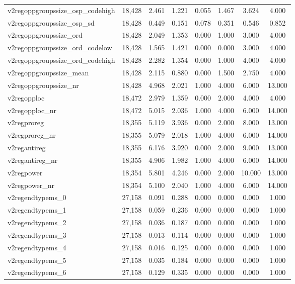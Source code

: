 \begin{table}[!htbp]
\begin{tabular}{@{\extracolsep{5pt}}lccccccc}
v2regoppgroupssize\_osp\_codehigh & 18,428 & 2.461 & 1.221 & 0.055 & 1.467 & 3.624 & 4.000 \\ 
v2regoppgroupssize\_osp\_sd & 18,428 & 0.449 & 0.151 & 0.078 & 0.351 & 0.546 & 0.852 \\ 
v2regoppgroupssize\_ord & 18,428 & 2.049 & 1.353 & 0.000 & 1.000 & 3.000 & 4.000 \\ 
v2regoppgroupssize\_ord\_codelow & 18,428 & 1.565 & 1.421 & 0.000 & 0.000 & 3.000 & 4.000 \\ 
v2regoppgroupssize\_ord\_codehigh & 18,428 & 2.282 & 1.354 & 0.000 & 1.000 & 4.000 & 4.000 \\ 
v2regoppgroupssize\_mean & 18,428 & 2.115 & 0.880 & 0.000 & 1.500 & 2.750 & 4.000 \\ 
v2regoppgroupssize\_nr & 18,428 & 4.968 & 2.021 & 1.000 & 4.000 & 6.000 & 13.000 \\ 
v2regopploc & 18,472 & 2.979 & 1.359 & 0.000 & 2.000 & 4.000 & 4.000 \\ 
v2regopploc\_nr & 18,472 & 5.015 & 2.036 & 1.000 & 4.000 & 6.000 & 14.000 \\ 
v2regproreg & 18,355 & 5.119 & 3.936 & 0.000 & 2.000 & 8.000 & 13.000 \\ 
v2regproreg\_nr & 18,355 & 5.079 & 2.018 & 1.000 & 4.000 & 6.000 & 14.000 \\ 
v2regantireg & 18,355 & 6.176 & 3.920 & 0.000 & 2.000 & 9.000 & 13.000 \\ 
v2regantireg\_nr & 18,355 & 4.906 & 1.982 & 1.000 & 4.000 & 6.000 & 14.000 \\ 
v2regpower & 18,354 & 5.801 & 4.246 & 0.000 & 2.000 & 10.000 & 13.000 \\ 
v2regpower\_nr & 18,354 & 5.100 & 2.040 & 1.000 & 4.000 & 6.000 & 14.000 \\ 
v2regendtypems\_0 & 27,158 & 0.091 & 0.288 & 0.000 & 0.000 & 0.000 & 1.000 \\ 
v2regendtypems\_1 & 27,158 & 0.059 & 0.236 & 0.000 & 0.000 & 0.000 & 1.000 \\ 
v2regendtypems\_2 & 27,158 & 0.036 & 0.187 & 0.000 & 0.000 & 0.000 & 1.000 \\ 
v2regendtypems\_3 & 27,158 & 0.013 & 0.114 & 0.000 & 0.000 & 0.000 & 1.000 \\ 
v2regendtypems\_4 & 27,158 & 0.016 & 0.125 & 0.000 & 0.000 & 0.000 & 1.000 \\ 
v2regendtypems\_5 & 27,158 & 0.035 & 0.184 & 0.000 & 0.000 & 0.000 & 1.000 \\ 
v2regendtypems\_6 & 27,158 & 0.129 & 0.335 & 0.000 & 0.000 & 0.000 & 1.000 \\ 

\end{tabular}
\end{table}
